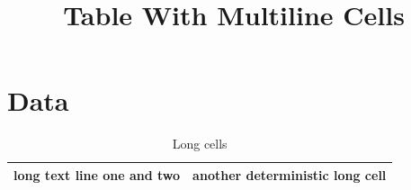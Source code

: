 \documentclass{article}
\begin{document}
\title{Table With Multiline Cells}\maketitle
\section{Data}\begin{table}[h]\centering\caption{Long cells}\label{tab:ml}\begin{tabular}{|p{5cm}|p{5cm}|}\hline long text line one and two & another deterministic long cell\\\hline\end{tabular}\end{table}
\end{document}
